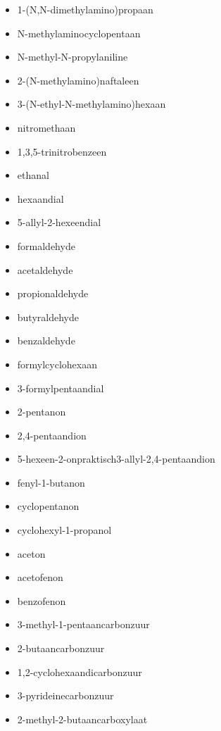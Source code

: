 \documentclass[a4paper,12pt]{article}
\begin{document}
\begin{enumerate}
\begin{enumerate}
\begin{itemize}
                    \item 1-(N,N-dimethylamino)propaan
                    \item N-methylaminocyclopentaan
                    \item N-methyl-N-propylaniline
                    \item 2-(N-methylamino)naftaleen
                    \item 3-(N-ethyl-N-methylamino)hexaan
                    \item nitromethaan
                    \item 1,3,5-trinitrobenzeen
                    \item ethanal
                    \item hexaandial
                    \item 5-allyl-2-hexeendial
                    \item formaldehyde
                    \item acetaldehyde
                    \item propionaldehyde
                    \item butyraldehyde
                    \item benzaldehyde
                    \item formylcyclohexaan
                    \item 3-formylpentaandial
                    \item 2-pentanon
                    \item 2,4-pentaandion
                    \item 5-hexeen-2-onpraktisch3-allyl-2,4-pentaandion
                    \item fenyl-1-butanon
                    \item cyclopentanon
                    \item cyclohexyl-1-propanol
                    \item aceton
                    \item acetofenon
                    \item benzofenon
                    \item 3-methyl-1-pentaancarbonzuur
                    \item 2-butaancarbonzuur
                    \item 1,2-cyclohexaandicarbonzuur
                    \item 3-pyrideinecarbonzuur
                    \item 2-methyl-2-butaancarboxylaat

\end{itemize}
\end{enumerate}
\end{enumerate}
\end{document}
